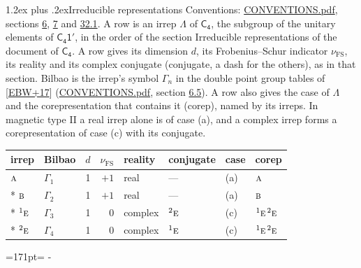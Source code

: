 \documentclass[10pt,a4paper]{article}
\makeatletter
\renewcommand\section{\@startsection{section}{1}{\z@}{-3ex plus -1ex minus -.2ex}%
  {1.2ex plus .2ex}{\normalfont\large\sffamily\bfseries\color{parttitle}}}
\newcommand{\needspace}[1]{\par\penalty-100\begingroup\dimen0=#1\relax\dimen2=\pagegoal
  \advance\dimen2-\pagetotal\ifdim\dimen0>\dimen2\relax\ifdim\dimen2>0pt\vfil\break\fi\fi
  \endgroup}
\numberwithin{equation}{section}
\newcommand{\grp}[1]{\mathsf{#1}}
\newcommand{\irr}[1]{\text{\normalfont\scshape #1}}
\newcommand{\conjpair}[1]{{}^{#1}}
\newcommand{\fsind}{\nu_{\mathrm{FS}}}
\makeatother
\begin{document}
\section{Irreducible representations}\label{s:irreps}
Conventions: \href{../../CONVENTIONS.pdf}{CONVENTIONS.pdf}, sections \href{../../../rotation/CONVENTIONS.pdf\#conv.6}{6}, \href{../../../rotation/CONVENTIONS.pdf\#conv.7}{7} and \href{../../CONVENTIONS.pdf\#conv.32.1}{32.1}.
\leavevmode\label{n:irrep.Delta}A row is an irrep $\Lambda$ of $\grp{C_{4}}$, the subgroup of the unitary elements of $\grp{C_{4}1'}$, in the order of the section Irreducible representations of the document of \href{../../../rotation/data/pdf/C4.pdf}{$\grp{C_{4}}$}. \label{n:index.dimension}\label{n:index.frobenius}\label{n:head.irrep}\label{n:head.reality}\label{n:head.conjugate}A row gives its dimension $d$, its Frobenius--Schur indicator $\fsind$, its reality and its complex conjugate (conjugate, a dash for the others), as in that section. \label{n:head.bilbao}\label{n:irrep.alias.gamma}Bilbao is the irrep's symbol $\Gamma_n$ in the double point group tables of [\href{../../../REFERENCES.pdf\#ref.EBW+17}{EBW+17}] (\href{../../CONVENTIONS.pdf}{CONVENTIONS.pdf}, section \href{../../../rotation/CONVENTIONS.pdf\#conv.6.5}{6.5}). \label{n:head.case.corep}\label{n:head.corep}A row also gives the case of $\Lambda$ and the corepresentation that contains it (corep), named by its irreps. In magnetic type II a real irrep alone is of case (a), and a complex irrep forms a corepresentation of case (c) with its conjugate.
\setlength{\emergencystretch}{2em}\par\setlength{\emergencystretch}{0pt}
{\small\renewcommand{\arraystretch}{1.25}\setlength{\tabcolsep}{4pt}\begin{longtable}{@{}llrrllll@{}}\toprule
irrep & Bilbao & $d$ & $\fsind$ & reality & conjugate & case & corep\\\midrule\endhead
\bottomrule\endfoot\endlastfoot
$\irr{a}$ & $\Gamma_{1}$ & 1 & $+1$ & real & --- & (a) & $\irr{a}$\\*
$\irr{b}$ & $\Gamma_{2}$ & 1 & $+1$ & real & --- & (a) & $\irr{b}$\\*
$\conjpair{1}\irr{e}$ & $\Gamma_{3}$ & 1 & $0$ & complex & $\conjpair{2}\irr{e}$ & (c) & $\conjpair{1}\irr{e}\,\conjpair{2}\irr{e}$\\*
$\conjpair{2}\irr{e}$ & $\Gamma_{4}$ & 1 & $0$ & complex & $\conjpair{1}\irr{e}$ & (c) & $\conjpair{1}\irr{e}\,\conjpair{2}\irr{e}$\\
\bottomrule\end{longtable}}
\needspace{171pt}
\end{document}
